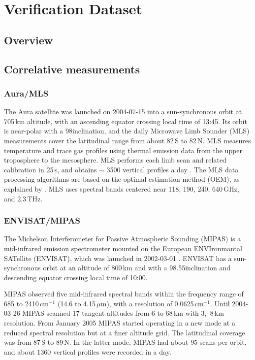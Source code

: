\chapter{Verification Dataset}
\label{chapter:vds}


\section{Overview}



\section{Correlative measurements}

\subsection{Aura/MLS}

The Aura satellite was launched on 2004-07-15 into a 
sun-synchronous orbit at 705\,km altitude, with an ascending
equator crossing local time of 13:45. Its
orbit is near-polar with a 98\degree inclination, 
and the daily Microwave Limb Sounder (MLS) measurements cover 
the latitudinal range from about 82\degree\,S to 82\degree\,N. 
MLS measures temperature and trace gas profiles 
using thermal emission data from the
upper troposphere to the mesosphere. MLS performs each
limb scan and related calibration in 25\,s, and 
obtains \(\sim\) 3500 vertical profiles a day 
\citep{waters2006}. The MLS data
processing algorithms are based on the optimal estimation
method (OEM), as explained by \citet{livesey2011}. MLS uses
spectral bands centered near 118, 190, 240, 640\,GHz,
and 2.3\,THz. 

\subsection{ENVISAT/MIPAS}

The Michelson Interferometer for Passive Atmospheric
Sounding (MIPAS) is a mid-infrared emission spectrometer
mounted on the European ENVIronmantal SATellite (ENVISAT),
which was launched in 2002-03-01 \citep{fischer2008}. 
ENVISAT has a sun-synchronous orbit at an altitude of 800\,km
and with a 98.55\degree inclination and descending equator 
crossing local time of 10:00.

MIPAS observed five mid-infrared spectral bands within the
frequency range of 685 to 2410\,cm\(^{-1}\) (14.6 to 4.15\,\(\mu\)m),
with a resolution of 0.0625\,cm\(^{-1}\).
Until 2004-03-26 MIPAS scanned 17 tangent altitudes from 
6 to 68\,km with 3,-\,8\,km resolution.
From January 2005 MIPAS started operating in a new mode
at a reduced spectral resolution but at a finer altitude
grid. The latitudinal coverage was from 87\degree\,S to 89\degree\,N.
In the latter mode, MIPAS had about 95 scans per orbit, and about
1360 vertical profiles were recorded in a day.


